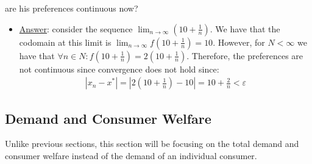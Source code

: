 \documentclass{article}
\begin{document}
\begin{itemize}
  are his preferences continuous now?
  \begin{itemize}
    \item  \underline{Answer}: consider the sequence $\lim_{n \rightarrow \infty} (10 + \tfrac{1}{n})$. We have that the codomain at this limit is $\lim_{n \rightarrow \infty} f(10 + \tfrac{1}{n}) = 10$. However, for $N < \infty$ we have that $\forall n \in N: f(10 + \tfrac{1}{n}) = 2(10 + \tfrac{1}{n})$. Therefore, the preferences are not continuous since convergence does not hold since:
    \begin{gather*}
      |x_{n} - x^{*}| = |2(10 + \frac{1}{n}) - 10| = 10 + \frac{2}{n} < \varepsilon
    \end{gather*}
  \end{itemize}
\end{itemize}

\newpage

\vspace{2.5mm}
\subsection{Demand and Consumer Welfare}
Unlike previous sections, this section will be focusing on the total demand and consumer welfare instead of the demand of an individual consumer. \par
\vspace{6mm}
\end{document}
